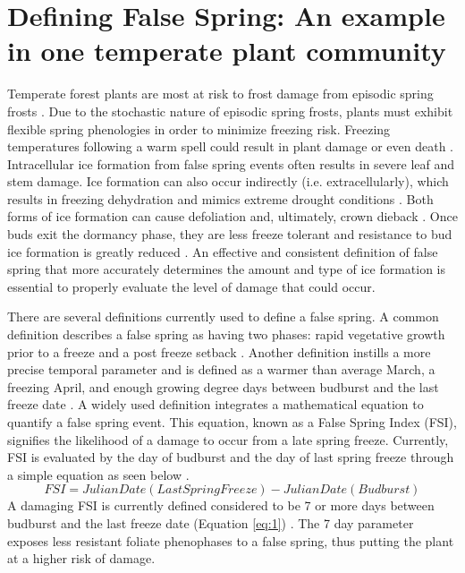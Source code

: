 \documentclass{article}\usepackage[]{graphicx}\usepackage[]{color}
\begin{document}
\section{Defining False Spring: An example in one temperate plant community}
Temperate forest plants are most at risk to frost damage from episodic spring frosts \citep{Sakai1987}. Due to the stochastic nature of episodic spring frosts, plants must exhibit flexible spring phenologies in order to minimize freezing risk. Freezing temperatures following a warm spell could result in plant damage or even death \citep{Ludlum1968, Mock2007}. Intracellular ice formation from false spring events often results in severe leaf and stem damage. Ice formation can also occur indirectly (i.e. extracellularly), which results in freezing dehydration and mimics extreme drought conditions \citep{Pearce2001, Beck2004, Hofmann2015}. Both forms of ice formation can cause defoliation and, ultimately, crown dieback \citep{Gu2008}. Once buds exit the dormancy phase, they are less freeze tolerant and resistance to bud ice formation is greatly reduced \citep{Taschler2004, Lenz2013, Vitasse2014}. An effective and consistent definition of false spring that more accurately determines the amount and type of ice formation is essential to properly evaluate the level of damage that could occur.

There are several definitions currently used to define a false spring. A common definition describes a false spring as having two phases: rapid vegetative growth prior to a freeze and a post freeze setback \citep{Gu2008}. Another definition instills a more precise temporal parameter and is defined as a warmer than average March, a freezing April, and enough growing degree days between budburst and the last freeze date \citep{Augspurger2013}. A widely used definition integrates a mathematical equation to quantify a false spring event. This equation, known as a False Spring Index (FSI), signifies the likelihood of a damage to occur from a late spring freeze. Currently, FSI is evaluated by the day of budburst and the day of last spring freeze through a simple equation as seen below \citep{Marino2011}. 
\begin{equation} \label{eq:1}
FSI = Julian Date (Last Spring Freeze) - Julian Date (Budburst)
\end{equation}
A damaging FSI is currently defined considered to be 7 or more days between budburst and the last freeze date (Equation \ref{eq:1}) \citep{Peterson2014}. The 7 day parameter exposes less resistant foliate phenophases to a false spring, thus putting the plant at a higher risk of damage. 
\end{document}
